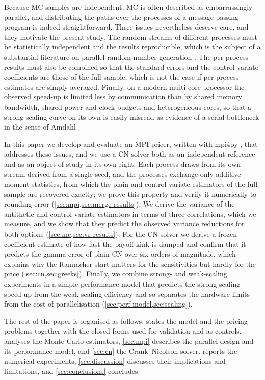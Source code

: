\documentclass[11pt,a4paper]{article}
\begin{document}
Because MC samples are independent, MC is often described as embarrassingly parallel, and distributing the paths over the processes of a message-passing program is indeed straightforward.
Three issues nevertheless deserve care, and they motivate the present study.
The random streams of different processes must be statistically independent and the results reproducible, which is the subject of a substantial literature on parallel random number generation \citep{salmon2011,lecuyer2017}.
The per-process results must also be combined so that the standard errors and the control-variate coefficients are those of the full sample, which is not the case if per-process estimates are simply averaged.
Finally, on a modern multi-core processor the observed speed-up is limited less by communication than by shared memory bandwidth, shared power and clock budgets and heterogeneous cores, so that a strong-scaling curve on its own is easily misread as evidence of a serial bottleneck in the sense of Amdahl \citep{amdahl1967,gustafson1988}.

In this paper we develop and evaluate an MPI pricer, written with mpi4py \citep{dalcin2005}, that addresses these issues, and we use a CN solver both as an independent reference and as an object of study in its own right.
Each process draws from its own stream derived from a single seed, and the processes exchange only additive moment statistics, from which the plain and control-variate estimators of the full sample are recovered exactly; we prove this property and verify it numerically to rounding error (\cref{sec:mpi,sec:merge-results}).
We derive the variance of the antithetic and control-variate estimators in terms of three correlations, which we measure, and we show that they predict the observed variance reductions for both options (\cref{sec:mc,sec:vr-results}).
For the CN solver we derive a frozen-coefficient estimate of how fast the payoff kink is damped and confirm that it predicts the gamma error of plain CN over six orders of magnitude, which explains why the Rannacher start matters for the sensitivities but hardly for the price (\cref{sec:cn,sec:greeks}).
Finally, we combine strong- and weak-scaling experiments in a simple performance model that predicts the strong-scaling speed-up from the weak-scaling efficiency and so separates the hardware limits from the cost of parallelisation (\cref{sec:perf-model,sec:scaling}).

The rest of the paper is organised as follows.
 states the model and the pricing problems together with the closed forms used for validation and as controls.
 analyses the Monte Carlo estimators, \cref{sec:mpi} describes the parallel design and its performance model, and \cref{sec:cn} the Crank--Nicolson solver.
 reports the numerical experiments, \cref{sec:discussion} discusses their implications and limitations, and \cref{sec:conclusions} concludes.
\end{document}
